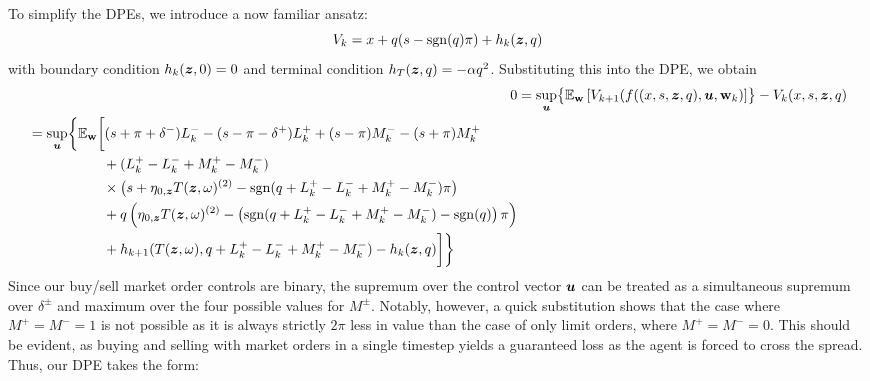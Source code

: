 To simplify the DPEs, we introduce a now familiar ansatz:
\begin{equation}
\label{eq:ansatzHcase1discrete}
V_k = x + q(s-\operatorname{\mathrm{sgn}}(q)\pi) + h_k(\bm{z},q)
\end{equation}
with boundary condition $h_k(\bm{z},0) = 0$ and terminal condition $h_T(\bm{z},q) = -\alpha q^2$. Substituting this into the DPE, we obtain
\begin{align}
0 & = \sup_{\bu} \bigl\lbrace \E_{\bw} \left[ V_{k+1} (f((x,s,\bz,q),\bu,\bw_k) \right] \bigr\rbrace - V_k (x,s,\bz,q)  \nonumber \\
\begin{split} & = \sup_{\bu} \biggl\lbrace \E_{\bw} \biggl[
(s + \pi + \delta^-)L_k^- - (s - \pi - \delta^+)L_k^+ + (s - \pi)M_k^- - (s + \pi)M_k^+ \\
& \hphantom{\sup_{\bu} \biggl\lbrace \E_{\bw} \biggl[ {}+{}} + (L_k^+ - L_k^- + M_k^+ - M_k^-) \\
& \hphantom{\sup_{\bu} \biggl\lbrace \E_{\bw} \biggl[ {}+{}} \times \bigl( s + \eta_{0,\bz} T(\bz, \omega)^{(2)}  -\sgn( q + L_k^+ - L_k^- + M_k^+ - M_k^-)\pi   \bigr) \\
& \hphantom{\sup_{\bu} \biggl\lbrace \E_{\bw} \biggl[ {}+{}} + q\left( \eta_{0,\bz} T(\bz, \omega)^{(2)}  -\left( \sgn( q + L_k^+ - L_k^- + M_k^+ - M_k^-) - \sgn(q) \right) \pi \right) \\
& \hphantom{\sup_{\bu} \biggl\lbrace \E_{\bw} \biggl[ {}+{}} + h_{k+1}(T(\bz,\omega), q + L_k^+ - L_k^- + M_k^+ - M_k^-) -  h_k(\bz,q) \biggr] \biggr\rbrace 
\end{split}
\end{align}
Since our buy/sell market order controls are binary, the supremum over the control vector $\bm{u}$ can be treated as a simultaneous supremum over $\delta^\pm$ and maximum over the four possible values for $M^\pm$. Notably, however, a quick substitution shows that the case where $M^+ = M^- = 1$ is not possible as it is always strictly $2\pi$ less in value than the case of only limit orders, where $M^+ = M^- = 0$. This should be evident, as buying and selling with market orders in a single timestep yields a guaranteed loss as the agent is forced to cross the spread. Thus, our DPE takes the form:
